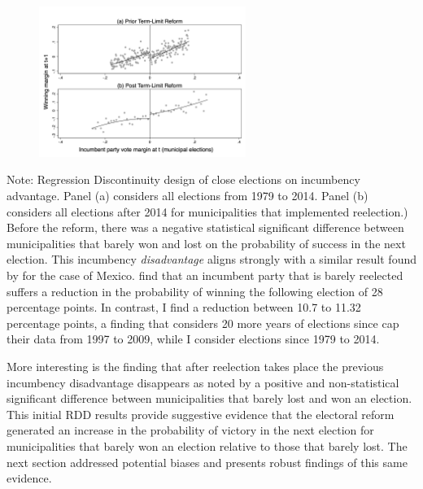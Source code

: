 \documentclass[12pt]{amsart}
\numberwithin{equation}{section}
\theoremstyle{definition}
\theoremstyle{definition}
\theoremstyle{definition}
\begin{document}
\begin{appendix}
\begin{figure}[H]
 \includegraphics[width=0.6\textwidth]{../Figures_incumbency/RDD_incumbency_margin_pol2.png}
     \captionsetup{justification=centering}  
       
\end{figure} 
       Note: Regression Discontinuity design of close elections on incumbency advantage. Panel (a) considers all elections from 1979 to 2014. Panel (b) considers all elections after 2014 for municipalities that implemented reelection.) 
\\
       
Before the reform, there was a negative statistical significant difference between municipalities that barely won and lost on the probability of success in the next election. This incumbency \emph{disadvantage} aligns strongly with a similar result found by \citet{klasnja_titiunik_2017} for the case of Mexico. \citet{klasnja_titiunik_2017} find that an incumbent party that is barely reelected suffers a reduction in the probability of winning the following election of 28 percentage points. In contrast, I find a reduction between 10.7 to 11.32 percentage points, a finding that considers 20 more years of elections since \citet{klasnja_titiunik_2017} cap their data from 1997 to 2009, while I consider elections since 1979 to 2014. 

More interesting is the finding that after reelection takes place the previous incumbency disadvantage disappears as noted by a positive and non-statistical significant difference between municipalities that barely lost and won an election. This initial RDD results provide suggestive evidence that the electoral reform generated an increase in the probability of victory in the next election for municipalities that barely won an election relative to those that barely lost. The next section addressed potential biases and presents robust findings of this same evidence.  


 \\ 
  

\end{appendix}
\end{document}
